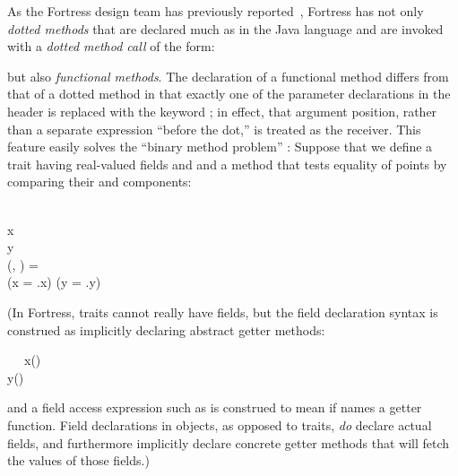 As the Fortress design team has previously reported~\cite{FORTRESS-MODULAR-MULTIPLE-DISPATCH},
Fortress has not only \emph{dotted methods} that
are declared much as in the Java language and are invoked with a 
\emph{dotted method call} of the form:
\begin{codeexamplesize}
\begin{tabbing}
\end{tabbing}
\end{codeexamplesize}
but also \emph{functional methods}.  The declaration
of a functional method differs from that of a dotted method
in that exactly one of the parameter  declarations
in the header is replaced with the keyword ; in effect,
that argument position, rather than a separate expression
``before the dot,'' is treated as the receiver.
This feature easily solves the ``binary method problem'' \cite{BRUCE-ON-BINARY-METHODS}:
Suppose that we define a trait  having real-valued fields  and  and a method that tests equality
of points by comparing their  and  components:
\begin{codeexamplesize}
\begin{FortressCode}
  \\
\2\+x\COLON {} \\
  y\COLON {} \\
  (, \COLON {})\COLON {} = \\
  \2\+(x = .x) \wedge (y = .y)\-\- \\
\end{FortressCode}
\end{codeexamplesize}
(In Fortress, traits cannot really have fields, but the field declaration syntax
is construed as implicitly declaring abstract getter methods:
\begin{codeexamplesize}
\begin{FortressCode}
{\tt ~~}\+ x(\ultrathin)\COLON {} \\
   y(\ultrathin)\COLON {}\-
\end{FortressCode}
\end{codeexamplesize}
and a field access expression such as  is construed to mean 
if  names a getter function.  Field declarations in objects,
as opposed to traits, \emph{do} declare actual fields, and furthermore
implicitly declare concrete getter methods that will fetch the values of
those fields.)

